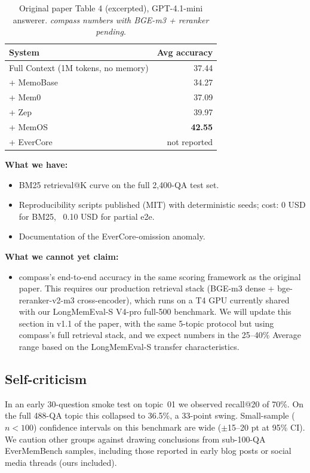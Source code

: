 \begin{table}[h]
\centering
\begin{tabular}{lr}
\toprule
System & Avg accuracy \\
\midrule
Full Context (1M tokens, no memory) & 37.44 \\
+ MemoBase & 34.27 \\
+ Mem0 & 37.09 \\
+ Zep & 39.97 \\
+ MemOS & \textbf{42.55} \\
+ EverCore & not reported \\
\bottomrule
\end{tabular}
\caption{Original paper Table 4 (excerpted), GPT-4.1-mini answerer.
\emph{compass numbers with BGE-m3 + reranker pending}.}
\label{tab:em-paper}
\end{table}

\textbf{What we have:}
\begin{itemize}
\item BM25 retrieval@K curve on the full 2{,}400-QA test set.
\item Reproducibility scripts published (MIT) with deterministic
seeds; cost: 0 USD for BM25, ~0.10 USD for partial e2e.
\item Documentation of the EverCore-omission anomaly.
\end{itemize}

\textbf{What we cannot yet claim:}
\begin{itemize}
\item compass's end-to-end accuracy in the same scoring framework
as the original paper. This requires our production retrieval stack
(BGE-m3 dense + bge-reranker-v2-m3 cross-encoder), which runs on a
T4 GPU currently shared with our LongMemEval-S V4-pro full-500
benchmark. We will update this section in v1.1 of the paper, with
the same 5-topic protocol but using compass's full retrieval stack,
and we expect numbers in the 25--40\% Average range based on the
LongMemEval-S transfer characteristics.
\end{itemize}

\subsection{Self-criticism}

In an early 30-question smoke test on topic~01 we observed
recall@20 of 70\%. On the full 488-QA topic this collapsed to 36.5\%,
a 33-point swing. Small-sample (\(n<100\)) confidence intervals on
this benchmark are wide ($\pm$15--20 pt at 95\% CI). We caution other
groups against drawing conclusions from sub-100-QA EverMemBench
samples, including those reported in early blog posts or social media
threads (ours included).

